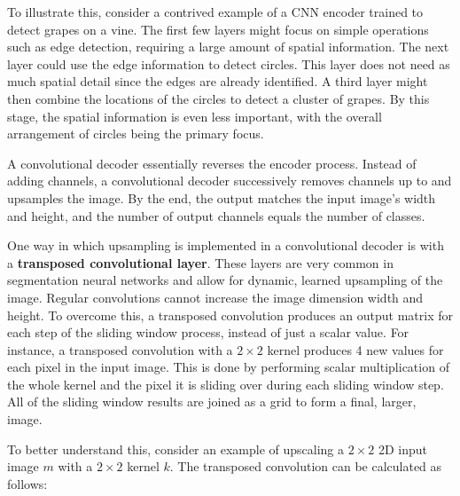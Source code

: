 To illustrate this, consider a contrived example of a CNN encoder trained to detect grapes on a vine. The first few layers might focus on simple operations such as edge detection, requiring a large amount of spatial information. The next layer could use the edge information to detect circles. This layer does not need as much spatial detail since the edges are already identified. A third layer might then combine the locations of the circles to detect a cluster of grapes. By this stage, the spatial information is even less important, with the overall arrangement of circles being the primary focus.

A convolutional decoder essentially reverses the encoder process. Instead of adding channels, a convolutional decoder successively removes channels up to and upsamples the image. By the end, the output matches the input image's width and height, and the number of output channels equals the number of classes.

One way in which upsampling is implemented in a convolutional decoder is with a \textbf{transposed convolutional layer}. These layers are very common in segmentation neural networks and allow for dynamic, learned upsampling of the image. Regular convolutions cannot increase the image dimension width and height. To overcome this, a transposed convolution produces an output matrix for each step of the sliding window process, instead of just a scalar value. For instance, a transposed convolution with a $2 \times 2$ kernel produces 4 new values for each pixel in the input image. This is done by performing scalar multiplication of the whole kernel and the pixel it is sliding over during each sliding window step. All of the sliding window results are joined as a grid to form a final, larger, image.

To better understand this, consider an example of upscaling a $2 \times 2$ 2D input image $m$ with a $2 \times 2$ kernel $k$. The transposed convolution can be calculated as follows:

